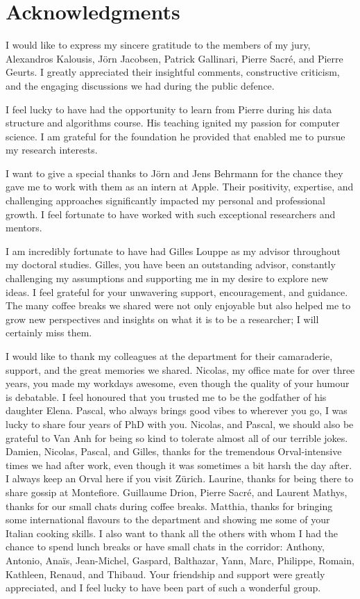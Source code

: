 
\chapter*{Acknowledgments}
I would like to express my sincere gratitude to the members of my jury, Alexandros Kalousis, J{\"o}rn Jacobsen, Patrick Gallinari, Pierre Sacr{\'e}, and Pierre Geurts. I greatly appreciated their insightful comments, constructive criticism, and the engaging discussions we had during the public defence.

I feel lucky to have had the opportunity to learn from Pierre during his data structure and algorithms course. His teaching ignited my passion for computer science. I am grateful for the foundation he provided that enabled me to pursue my research interests.

I want to give a special thanks to J{\"o}rn and Jens Behrmann for the chance they gave me to work with them as an intern at Apple. Their positivity, expertise, and challenging approaches significantly impacted my personal and professional growth. I feel fortunate to have worked with such exceptional researchers and mentors.

I am incredibly fortunate to have had Gilles Louppe as my advisor throughout my doctoral studies. Gilles, you have been an outstanding advisor, constantly challenging my assumptions and supporting me in my desire to explore new ideas. I feel grateful for your unwavering support, encouragement, and guidance. The many coffee breaks we shared were not only enjoyable but also helped me to grow new perspectives and insights on what it is to be a researcher; I will certainly miss them.

I would like to thank my colleagues at the department for their camaraderie, support, and the great memories we shared. Nicolas, my office mate for over three years, you made my workdays awesome, even though the quality of your humour is debatable. I feel honoured that you trusted me to be the godfather of his daughter Elena. Pascal, who always brings good vibes to wherever you go, I was lucky to share four years of PhD with you. Nicolas, and Pascal, we should also be grateful to Van Anh for being so kind to tolerate almost all of our terrible jokes. Damien, Nicolas, Pascal, and Gilles, thanks for the tremendous Orval-intensive times we had after work, even though it was sometimes a bit harsh the day after. I always keep an Orval here if you visit Zürich. Laurine, thanks for being there to share gossip at Montefiore. Guillaume Drion, Pierre Sacr{\'e}, and Laurent Mathys, thanks for our small chats during coffee breaks. Matthia, thanks for bringing some international flavours to the department and showing me some of your Italian cooking skills. I also want to thank all the others with whom I had the chance to spend lunch breaks or have small chats in the corridor: Anthony, Antonio, Anaïs, Jean-Michel, Gaspard, Balthazar, Yann, Marc, Philippe, Romain, Kathleen, Renaud, and Thibaud. Your friendship and support were greatly appreciated, and I feel lucky to have been part of such a wonderful group.

